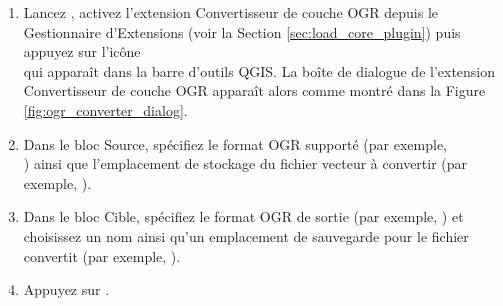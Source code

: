 
\begin{enumerate}
  \item Lancez \qg, activez l'extension Convertisseur de couche OGR depuis le 
  Gestionnaire d'Extensions (voir la Section \ref{sec:load_core_plugin}) puis 
  appuyez sur l'icône\\  
  qui apparaît dans la barre d'outils QGIS. La boîte de dialogue de 
  l'extension Convertisseur de couche OGR apparaît alors comme montré dans la 
  Figure \ref{fig:ogr_converter_dialog}.
  \item Dans le bloc Source, spécifiez le format OGR supporté (par exemple,\\ ) 
  ainsi que l'emplacement de stockage du fichier vecteur à convertir (par exemple, ).
  \item Dans le bloc Cible, spécifiez le format OGR de sortie (par exemple, ) 
  et choisissez un nom ainsi qu'un emplacement de sauvegarde pour le fichier 
  convertit (par exemple, ).
  \item Appuyez sur .
\end{enumerate}
